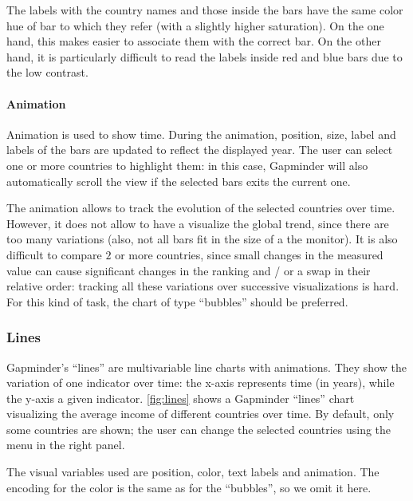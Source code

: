 The labels with the country names and those inside the bars have the same color hue of bar to which they refer (with a slightly higher saturation).
On the one hand, this makes easier to associate them with the correct bar.
On the other hand, it is particularly difficult to read the labels inside red and blue bars due to the low contrast.

\paragraph{Animation}
Animation is used to show time.
During the animation, position, size, label and labels of the bars are updated to reflect the displayed year.
The user can select one or more countries to highlight them:
in this case, Gapminder will also automatically scroll the view if the selected bars exits the current one.

The animation allows to track the evolution of the selected countries over time.
However, it does not allow to have a visualize the global trend, since there are too many variations (also, not all bars fit in the size of a the monitor).
It is also difficult to compare $2$ or more countries, since small changes in the measured value can cause significant changes in the ranking and / or a swap in their relative order: tracking all these variations over successive visualizations is hard.
For this kind of task, the chart of type ``bubbles'' should be preferred.


\subsubsection{Lines}
Gapminder's ``lines'' are multivariable line charts with animations.
They show the variation of one indicator over time:
the x-axis represents time (in years), while the y-axis a given indicator.
\cref{fig:lines} shows a Gapminder ``lines'' chart visualizing the average income of different countries over time.
By default, only some countries are shown;
the user can change the selected countries using the menu in the right panel.

The visual variables used are position, color, text labels and animation.
The encoding for the color is the same as for the ``bubbles'', so we omit it here.

